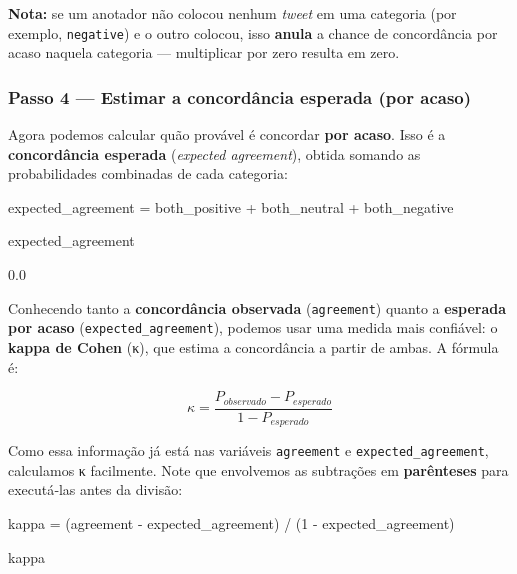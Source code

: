 \documentclass[
  brazilian,
  11pt,
]{article}
\newenvironment{Shaded}{\begin{snugshade}}{\end{snugshade}}
\newcommand{\DecValTok}[1]{\textcolor[rgb]{0.96,0.45,0.00}{#1}}
\newcommand{\NormalTok}[1]{\textcolor[rgb]{0.81,0.81,0.76}{#1}}
\newcommand{\OperatorTok}[1]{\textcolor[rgb]{0.81,0.81,0.76}{#1}}
\let\oldtexttt\texttt
\renewcommand{\texttt}[1]{{\color{inlink}\oldtexttt{#1}}}
\begin{document}
\begin{notebox}

\textbf{Nota:} se um anotador não colocou nenhum \emph{tweet} em uma
categoria (por exemplo, \texttt{negative}) e o outro colocou, isso
\textbf{anula} a chance de concordância por acaso naquela categoria ---
multiplicar por zero resulta em zero.

\end{notebox}

\subsubsection{Passo 4 --- Estimar a concordância esperada (por
acaso)}\label{passo-4-estimar-a-concorduxe2ncia-esperada-por-acaso}

Agora podemos calcular quão provável é concordar \textbf{por acaso}.
Isso é a \textbf{concordância esperada} (\emph{expected agreement}),
obtida somando as probabilidades combinadas de cada categoria:

\begin{Shaded}
\begin{Highlighting}[]
\NormalTok{expected\_agreement }\OperatorTok{=}\NormalTok{ both\_positive }\OperatorTok{+}\NormalTok{ both\_neutral }\OperatorTok{+}\NormalTok{ both\_negative}

\NormalTok{expected\_agreement}
\end{Highlighting}
\end{Shaded}

\begin{Shaded}
\begin{Highlighting}[]
\NormalTok{0.0}
\end{Highlighting}
\end{Shaded}

Conhecendo tanto a \textbf{concordância observada} (\texttt{agreement})
quanto a \textbf{esperada por acaso} (\texttt{expected\_agreement}),
podemos usar uma medida mais confiável: o \textbf{kappa de Cohen} (κ),
que estima a concordância a partir de ambas. A fórmula é:

\[\kappa = \frac{P_{observado} - P_{esperado}}{1 - P_{esperado}}\]

Como essa informação já está nas variáveis \texttt{agreement} e
\texttt{expected\_agreement}, calculamos κ facilmente. Note que
envolvemos as subtrações em \textbf{parênteses} para executá‑las antes
da divisão:

\begin{Shaded}
\begin{Highlighting}[]
\NormalTok{kappa }\OperatorTok{=}\NormalTok{ (agreement }\OperatorTok{{-}}\NormalTok{ expected\_agreement) }\OperatorTok{/}\NormalTok{ (}\DecValTok{1} \OperatorTok{{-}}\NormalTok{ expected\_agreement)}

\NormalTok{kappa}
\end{Highlighting}
\end{Shaded}
\end{document}
